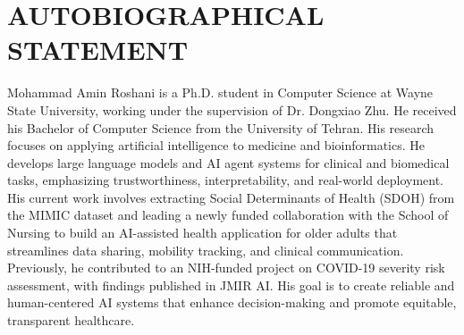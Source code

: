 \section*{AUTOBIOGRAPHICAL STATEMENT}


Mohammad Amin Roshani is a Ph.D. student in Computer Science at Wayne State University, working under the supervision of Dr. Dongxiao Zhu. He received his Bachelor of Computer Science from the University of Tehran. His research focuses on applying artificial intelligence to medicine and bioinformatics. He develops large language models and AI agent systems for clinical and biomedical tasks, emphasizing trustworthiness, interpretability, and real-world deployment. His current work involves extracting Social Determinants of Health (SDOH) from the MIMIC dataset and leading a newly funded collaboration with the School of Nursing to build an AI-assisted health application for older adults that streamlines data sharing, mobility tracking, and clinical communication. Previously, he contributed to an NIH-funded project on COVID-19 severity risk assessment, with findings published in JMIR AI. His goal is to create reliable and human-centered AI systems that enhance decision-making and promote equitable, transparent healthcare.
